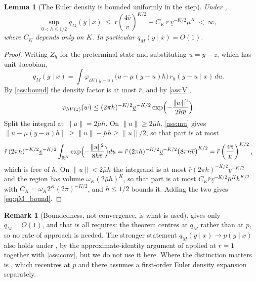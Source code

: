 \documentclass[11pt]{article}
\newtheorem{lemma}[lemma]{Lemma}
\theoremstyle{definition}
\newtheorem{remark}[remark]{Remark}
\newcommand{\R}{\mathbb{R}}
\begin{document}
\begin{lemma}[The Euler density is bounded uniformly in the step]\label{lem:qM_bounded}
Under ,
\begin{equation}\label{eq:qM_bound}
\sup_{0<h\le1/2}q_M(y\mid x)\ \le\ \bar r\left(\frac{4\overline v}{\underline v}\right)^{K/2}+C_K\,\bar r\,\underline v^{-K/2}\bar\mu^K
\ <\ \infty,
\end{equation}
where $C_K$ depends only on $K$. In particular $q_M(y\mid x)=O(1)$.
\end{lemma}

\begin{proof}
Writing $Z_h$ for the preterminal state and substituting $u=y-z$, which has unit Jacobian,
\[
q_M(y\mid x)=\int\varphi_{hV(y-u)}\bigl(u-\mu(y-u)h\bigr)\,r_h(y-u\mid x)\,du .
\]
By \ref{ass:bound} the density factor is at most $\bar r$, and by \ref{ass:V},
\[
\varphi_{hV(z)}(w)\le(2\pi h)^{-K/2}\underline v^{-K/2}\exp\Bigl(-\frac{\lVert w\rVert^2}{2h\overline v}\Bigr).
\]
Split the integral at $\lVert u\rVert=2\bar\mu h$. On $\lVert u\rVert\ge2\bar\mu h$, \ref{ass:mu} gives $\lVert u-\mu(y-u)h\rVert\ge\lVert u\rVert-\bar\mu h\ge\lVert u\rVert/2$, so that part is at most
\[
\bar r\,(2\pi h)^{-K/2}\underline v^{-K/2}\int_{\R^K}\exp\Bigl(-\frac{\lVert u\rVert^2}{8h\overline v}\Bigr)du
=\bar r\,(2\pi h)^{-K/2}\underline v^{-K/2}\bigl(8\pi h\overline v\bigr)^{K/2}
=\bar r\left(\frac{4\overline v}{\underline v}\right)^{K/2},
\]
which is free of $h$. On $\lVert u\rVert<2\bar\mu h$ the integrand is at most $\bar r(2\pi h)^{-K/2}\underline v^{-K/2}$ and the region has volume $\omega_K(2\bar\mu h)^K$, so that part is at most $C_K\bar r\underline v^{-K/2}\bar\mu^Kh^{K/2}$ with $C_K=\omega_K2^K(2\pi)^{-K/2}$, and $h\le1/2$ bounds it. Adding the two gives \eqref{eq:qM_bound}.
\end{proof}

\begin{remark}[Boundedness, not convergence, is what is used]\label{rem:qM_scope}
 gives only $q_M=O(1)$, and that is all  requires: the theorem centres at $q_M$ rather than at $p$, so no rate of approach is needed. The stronger statement $q_M(y\mid x)\to p(y\mid x)$ also holds under , by the approximate-identity argument of  applied at $r=1$ together with \ref{ass:conv}, but we do not use it here. Where the distinction matters is , which recentres at $p$ and there assumes a first-order Euler density expansion separately.
\end{remark}
\end{document}
